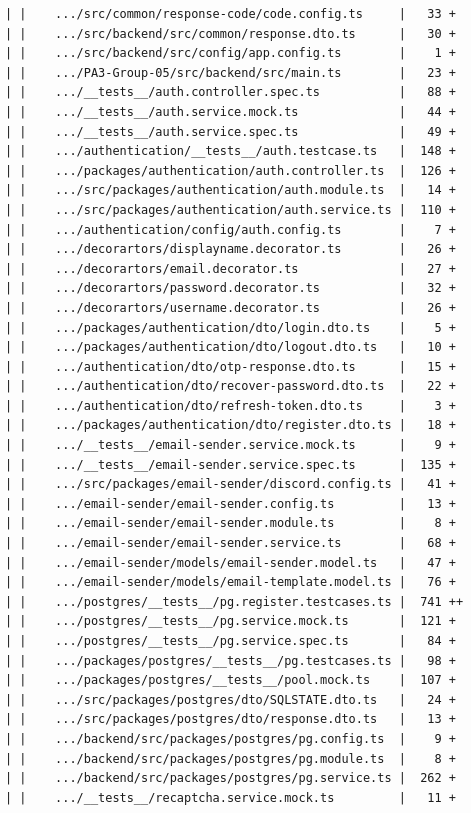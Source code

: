 \documentclass[12pt]{article}
\begin{document}
\begin{lstlisting}[numbers=none,breaklines=true]
| |    .../src/common/response-code/code.config.ts     |   33 +
| |    .../src/backend/src/common/response.dto.ts      |   30 +
| |    .../src/backend/src/config/app.config.ts        |    1 +
| |    .../PA3-Group-05/src/backend/src/main.ts        |   23 +
| |    .../__tests__/auth.controller.spec.ts           |   88 +
| |    .../__tests__/auth.service.mock.ts              |   44 +
| |    .../__tests__/auth.service.spec.ts              |   49 +
| |    .../authentication/__tests__/auth.testcase.ts   |  148 +
| |    .../packages/authentication/auth.controller.ts  |  126 +
| |    .../src/packages/authentication/auth.module.ts  |   14 +
| |    .../src/packages/authentication/auth.service.ts |  110 +
| |    .../authentication/config/auth.config.ts        |    7 +
| |    .../decorartors/displayname.decorator.ts        |   26 +
| |    .../decorartors/email.decorator.ts              |   27 +
| |    .../decorartors/password.decorator.ts           |   32 +
| |    .../decorartors/username.decorator.ts           |   26 +
| |    .../packages/authentication/dto/login.dto.ts    |    5 +
| |    .../packages/authentication/dto/logout.dto.ts   |   10 +
| |    .../authentication/dto/otp-response.dto.ts      |   15 +
| |    .../authentication/dto/recover-password.dto.ts  |   22 +
| |    .../authentication/dto/refresh-token.dto.ts     |    3 +
| |    .../packages/authentication/dto/register.dto.ts |   18 +
| |    .../__tests__/email-sender.service.mock.ts      |    9 +
| |    .../__tests__/email-sender.service.spec.ts      |  135 +
| |    .../src/packages/email-sender/discord.config.ts |   41 +
| |    .../email-sender/email-sender.config.ts         |   13 +
| |    .../email-sender/email-sender.module.ts         |    8 +
| |    .../email-sender/email-sender.service.ts        |   68 +
| |    .../email-sender/models/email-sender.model.ts   |   47 +
| |    .../email-sender/models/email-template.model.ts |   76 +
| |    .../postgres/__tests__/pg.register.testcases.ts |  741 ++
| |    .../postgres/__tests__/pg.service.mock.ts       |  121 +
| |    .../postgres/__tests__/pg.service.spec.ts       |   84 +
| |    .../packages/postgres/__tests__/pg.testcases.ts |   98 +
| |    .../packages/postgres/__tests__/pool.mock.ts    |  107 +
| |    .../src/packages/postgres/dto/SQLSTATE.dto.ts   |   24 +
| |    .../src/packages/postgres/dto/response.dto.ts   |   13 +
| |    .../backend/src/packages/postgres/pg.config.ts  |    9 +
| |    .../backend/src/packages/postgres/pg.module.ts  |    8 +
| |    .../backend/src/packages/postgres/pg.service.ts |  262 +
| |    .../__tests__/recaptcha.service.mock.ts         |   11 +

\end{lstlisting}
\end{document}
